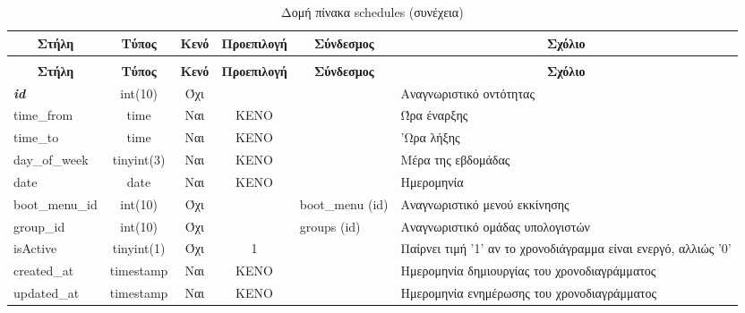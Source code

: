 %
%
\begin{longtable}{|l|c|c|c|l|p{4.5cm}|}
	\caption{Δομή πίνακα schedules} \label{tab:schedules-structure} \\
	\hline \multicolumn{1}{|c|}{\textbf{Στήλη}} & \multicolumn{1}{|c|}{\textbf{Τύπος}} & \multicolumn{1}{|c|}{\textbf{Κενό}} & \multicolumn{1}{|c|}{\textbf{Προεπιλογή}} & \multicolumn{1}{|c|}{\textbf{Σύνδεσμος}} & \multicolumn{1}{|c|}{\textbf{Σχόλιο}} \\ \hline \hline \endfirsthead
	\caption[{}]{Δομή πίνακα schedules (συνέχεια)} \\
	\hline \multicolumn{1}{|c|}{\textbf{Στήλη}} & \multicolumn{1}{|c|}{\textbf{Τύπος}} & \multicolumn{1}{|c|}{\textbf{Κενό}} & \multicolumn{1}{|c|}{\textbf{Προεπιλογή}} & \multicolumn{1}{|c|}{\textbf{Σύνδεσμος}} & \multicolumn{1}{|c|}{\textbf{Σχόλιο}} \\ \hline \hline \endhead \endfoot
	\textbf{\textit{id}} & int(10) & Όχι &  &  & Αναγνωριστικό οντότητας \\ \hline
	time\_from & time & Ναι & ΚΕΝΟ &  & Ώρα έναρξης \\ \hline
	time\_to & time & Ναι & ΚΕΝΟ &  & 'Ωρα λήξης \\ \hline
	day\_of\_week & tinyint(3) & Ναι & ΚΕΝΟ &  & Μέρα της εβδομάδας \\ \hline
	date & date & Ναι & ΚΕΝΟ &  & Ημερομηνία \\ \hline
	boot\_menu\_id & int(10) & Όχι &  & boot\_menu (id) & Αναγνωριστικό μενού εκκίνησης \\ \hline
	group\_id & int(10) & Όχι &  & groups (id) & Αναγνωριστικό ομάδας υπολογιστών \\ \hline
	isActive & tinyint(1) & Όχι & 1 &  & Παίρνει τιμή '1' αν το χρονοδιάγραμμα είναι ενεργό, αλλιώς '0'  \\ \hline 
	created\_at & timestamp & Ναι & ΚΕΝΟ &  & Ημερομηνία δημιουργίας του χρονοδιαγράμματος \\ \hline
	updated\_at & timestamp & Ναι & ΚΕΝΟ &  & Ημερομηνία ενημέρωσης του χρονοδιαγράμματος \\ \hline
\end{longtable}

